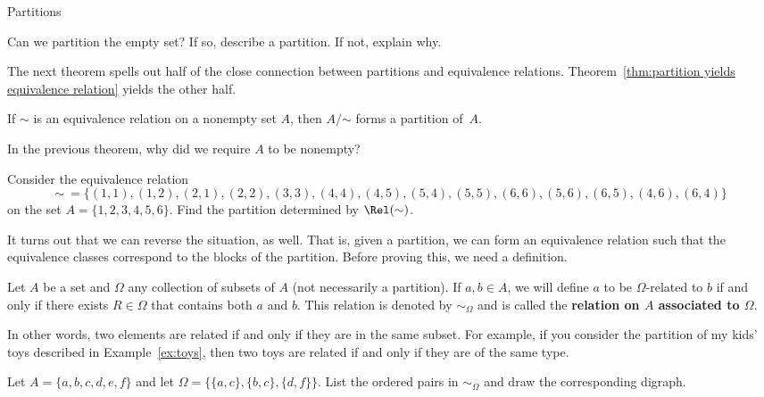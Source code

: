 \begin{section}{Partitions}
\begin{problem}
Can we partition the empty set?  If so, describe a partition.  If not, explain why.
\end{problem}

The next theorem spells out half of the close connection between partitions and equivalence relations. Theorem~\ref{thm:partition yields equivalence relation} yields the other half.

\begin{theorem}\label{thm:equiv yields partition2}
If $\sim$ is an equivalence relation on a nonempty set $A$, then $A/\mathord\sim$ forms a partition of~$A$.
\end{theorem}

\begin{problem}
In the previous theorem, why did we require $A$ to be nonempty?
\end{problem}

\begin{problem}
Consider the equivalence relation
\[
\sim\ =\{(1,1),(1,2),(2,1), (2,2),(3,3),(4,4),(4,5),(5,4),(5,5),(6,6),(5,6),(6,5),(4,6),(6,4)\}
\]
on the set $A=\{1,2,3,4,5,6\}$.  Find the partition determined by $\Rel(\sim)$.
\end{problem}

It turns out that we can reverse the situation, as well.  That is, given a partition, we can form an equivalence relation such that the equivalence classes correspond to the blocks of the partition.  Before proving this, we need a definition.

\begin{definition}
Let $A$ be a set and $\Omega$ any collection of subsets of $A$ (not necessarily a partition).  If $a,b\in A$, we will define $a$ to be $\Omega$-related to $b$ if and only if there exists $R\in \Omega$ that contains both $a$ and $b$.  This relation is denoted by $\sim_{\Omega}$ and is called the \textbf{relation on $A$ associated to $\Omega$}.
\end{definition}

In other words, two elements are related if and only if they are in the same subset. For example, if you consider the partition of my kids' toys described in Example~\ref{ex:toys}, then two toys are related if and only if they are of the same type.

\begin{problem}
Let $A=\{a,b,c,d,e,f\}$ and let $\Omega=\{\{a,c\},\{b,c\},\{d,f\}\}$.  List the ordered pairs in $\sim_{\Omega}$ and draw the corresponding digraph.
\end{problem}


\end{section}

